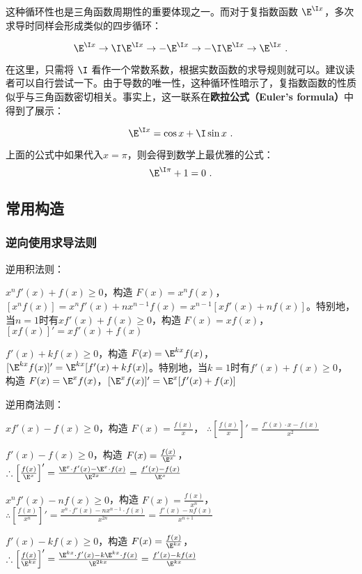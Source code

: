 这种循环性也是三角函数周期性的重要体现之一。而对于复指数函数 $\E^{\I x}$，多次求导时同样会形成类似的四步循环：

\begin{equation}
\E^{\I x} \to \I\E^{\I x} \to -\E^{\I x} \to -\I\E^{\I x} \to \E^{\I x}~.
\end{equation}

在这里，只需将 $\I$ 看作一个常数系数，根据实数函数的求导规则就可以。建议读者可以自行尝试一下。由于导数的唯一性，这种循环性暗示了，复指数函数的性质似乎与三角函数密切相关。事实上，这一联系在\textbf{欧拉公式（Euler’s formula）}中得到了展示：

\begin{equation}
\E^{\I x} = \cos x + \I\sin x~.
\end{equation}

上面的公式中如果代入$x=\pi$，则会得到数学上最优雅的公式：
\begin{equation}
\E^{\I \pi} + 1= 0~.
\end{equation}

\subsection{常用构造}


\subsubsection{逆向使用求导法则}

逆用积法则：

$x^n f'(x) + f(x) \geq 0$，构造 $F(x) = x^n f(x)$，$[x^n f(x)] = x^n f'(x) + nx^{n-1} f(x) = x^{n-1} [x f'(x) + nf(x)]$。特别地，当$n=1$时有$x f'(x) + f(x) \geq 0$，构造 $F(x) = x f(x)$，$[x f(x)]' = x f'(x) + f(x)$

$f'(x) + k f(x) \geq 0$，构造 $F(x) = \E^{kx} f(x)$，$[\E^{kx} f(x)]' = \E^{kx} [f'(x) + kf(x)]$。特别地，当$k=1$时有$f'(x) + f(x) \geq 0$，构造 $F(x) = \E^x f(x)$，$[\E^x f(x)]' = \E^x [f'(x) + f(x)]$

逆用商法则：

$xf'(x) - f(x) \geq 0$，构造 $F(x) = \frac{f(x)}{x}$，  
    $\therefore \left[\frac{f(x)}{x}\right]' = \frac{f'(x) \cdot x - f(x)}{x^2}$

$f'(x) - f(x) \geq 0$，构造 $F(x) = \frac{f(x)}{\E^x}$，  
    $\therefore \left[\frac{f(x)}{\E^x}\right]' = \frac{\E^x \cdot f'(x) - \E^x \cdot f(x)}{\E^{2x}} = \frac{f'(x) - f(x)}{\E^x}$

$x^n f'(x) - n f(x) \geq 0$，构造 $F(x) = \frac{f(x)}{x^n}$，  
    $\therefore \left[\frac{f(x)}{x^n}\right]' = \frac{x^n \cdot f'(x) - n x^{n-1} \cdot f(x)}{x^{2n}} = \frac{f'(x) - n f(x)}{x^{n+1}}$

$f'(x) - k f(x) \geq 0$，构造 $F(x) = \frac{f(x)}{\E^{kx}}$，  
    $\therefore \left[\frac{f(x)}{\E^{kx}}\right]' = \frac{\E^{kx} \cdot f'(x) - k \E^{kx} \cdot f(x)}{\E^{2kx}} = \frac{f'(x) - k f(x)}{\E^{kx}}$

